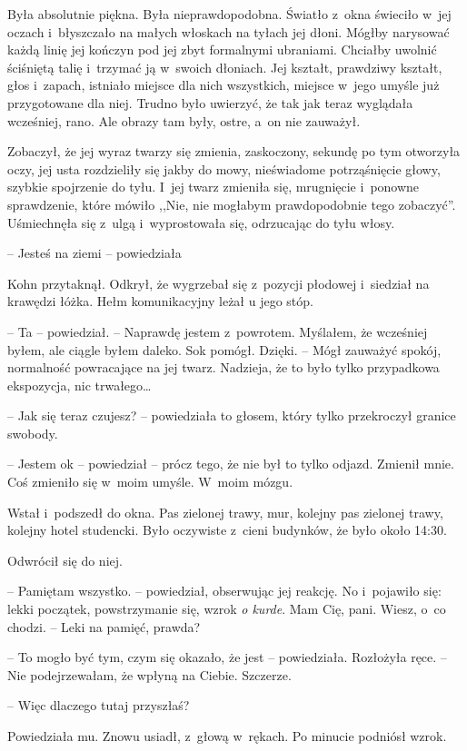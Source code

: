\documentclass[oneside,polish,11pt,sfheadings]{mwbk}
\begin{document}
Była absolutnie piękna. Była nieprawdopodobna. Światło z~okna świeciło w~jej oczach i~błyszczało na małych włoskach na tyłach jej dłoni. Mógłby
narysować każdą linię jej kończyn pod jej zbyt formalnymi ubraniami.
Chciałby uwolnić ściśniętą talię i~trzymać ją w~swoich dłoniach. Jej
kształt, prawdziwy kształt, głos i~zapach, istniało miejsce dla nich
wszystkich, miejsce w~jego umyśle już przygotowane dla niej. Trudno było
uwierzyć, że tak jak teraz wyglądała wcześniej, rano. Ale obrazy tam
były, ostre, a~on nie zauważył.

Zobaczył, że jej wyraz twarzy się zmienia, zaskoczony, sekundę po tym
otworzyła oczy, jej usta rozdzieliły się jakby do mowy, nieświadome
potrząśnięcie głowy, szybkie spojrzenie do tyłu. I~jej twarz zmieniła
się, mrugnięcie i~ponowne sprawdzenie, które mówiło ,,Nie, nie mogłabym
prawdopodobnie tego zobaczyć''. Uśmiechnęła się z~ulgą i~wyprostowała
się, odrzucając do tyłu włosy.

-- Jesteś na ziemi -- powiedziała

Kohn przytaknął. Odkrył, że wygrzebał się z~pozycji płodowej i~siedział
na krawędzi łóżka. Hełm komunikacyjny leżał u jego stóp.

-- Ta -- powiedział. -- Naprawdę jestem z~powrotem. Myślałem, że wcześniej
byłem, ale ciągle byłem daleko. Sok pomógł. Dzięki. -- Mógł zauważyć
spokój, normalność powracające na jej twarz. Nadzieja, że to było tylko
przypadkowa ekspozycja, nic trwałego\ldots

-- Jak się teraz czujesz? -- powiedziała to głosem, który tylko
przekroczył granice swobody.

-- Jestem ok -- powiedział -- prócz tego, że nie był to tylko odjazd.
Zmienił mnie. Coś zmieniło się w~moim umyśle. W~moim mózgu.

Wstał i~podszedł do okna. Pas zielonej trawy, mur, kolejny pas zielonej
trawy, kolejny hotel studencki. Było oczywiste z~cieni budynków, że było
około 14:30.

Odwrócił się do niej.

-- Pamiętam wszystko. -- powiedział, obserwując jej reakcję. No i~pojawiło
się: lekki początek, powstrzymanie się, wzrok \emph{o kurde}. Mam Cię,
pani. Wiesz, o~co chodzi. -- Leki na pamięć, prawda?

-- To mogło być tym, czym się okazało, że jest -- powiedziała. Rozłożyła
ręce. -- Nie podejrzewałam, że wpłyną na Ciebie. Szczerze.

-- Więc dlaczego tutaj przyszłaś?

Powiedziała mu. Znowu usiadł, z~głową w~rękach. Po minucie podniósł
wzrok.
\end{document}

